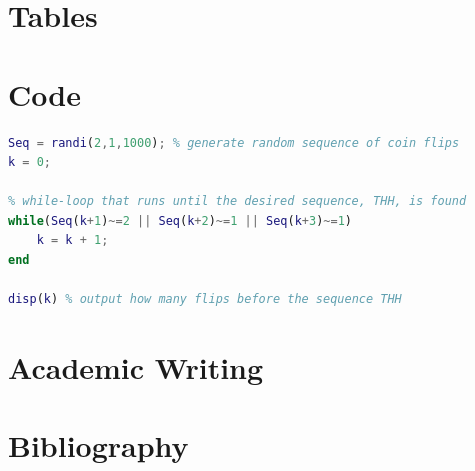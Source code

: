 \documentclass[11pt, a4paper]{article}
\begin{document}
\section{Tables}



\section{Code}

\begin{lstlisting}[language=MATLAB]
Seq = randi(2,1,1000); % generate random sequence of coin flips
k = 0;

% while-loop that runs until the desired sequence, THH, is found
while(Seq(k+1)~=2 || Seq(k+2)~=1 || Seq(k+3)~=1)
    k = k + 1;
end

disp(k) % output how many flips before the sequence THH
\end{lstlisting}




\section{Academic Writing}




\section{Bibliography}
\end{document}
